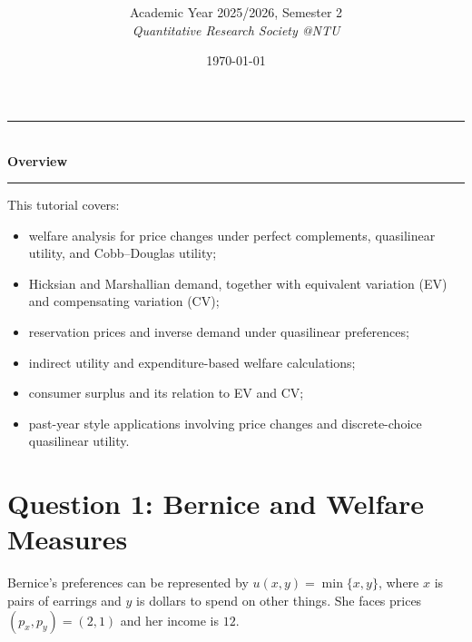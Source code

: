 \documentclass[12pt]{article}
\title{
\CourseCode \CourseName \\[0.3em]
\large \DocType
}
\author{
  Academic Year 2025/2026, Semester 2 \\[0.25em]
  \textit{Quantitative Research Society @NTU}
}
\date{\today}
\begin{document}
\maketitle
\thispagestyle{plainfirst}
\pagestyle{main}
\bigskip

\begin{center}
  \rule{0.8\textwidth}{0.4pt}\\[4pt]
  \textbf{Overview}\\[2pt]
  \rule{0.8\textwidth}{0.4pt}
\end{center}

\noindent
This tutorial covers:
\begin{itemize}[leftmargin=*]
  \item welfare analysis for price changes under perfect complements, quasilinear utility, and Cobb--Douglas utility;
  \item Hicksian and Marshallian demand, together with equivalent variation (EV) and compensating variation (CV);
  \item reservation prices and inverse demand under quasilinear preferences;
  \item indirect utility and expenditure-based welfare calculations;
  \item consumer surplus and its relation to EV and CV;
  \item past-year style applications involving price changes and discrete-choice quasilinear utility.
\end{itemize}

\bigskip

\newpage
\tableofcontents


\section{Question 1: Bernice and Welfare Measures}

\noindent
Bernice’s preferences can be represented by \(u(x, y)=\min\{x, y\}\), where \(x\) is pairs of earrings and \(y\) is dollars to spend on other things. She faces prices \((p_x, p_y)=(2,1)\) and her income is \(12\).
\end{document}
